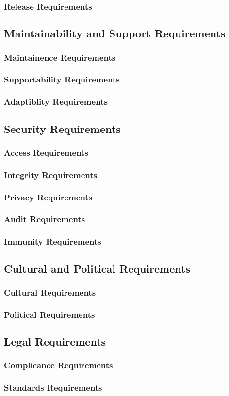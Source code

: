 \documentclass{article}
\begin{document}
\subsubsection{Release Requirements}

\subsection{Maintainability and Support Requirements}
\subsubsection{Maintainence Requirements}
\subsubsection{Supportability Requirements}
\subsubsection{Adaptiblity Requirements}

\subsection{Security Requirements}
\subsubsection{Access Requirements}
\subsubsection{Integrity Requirements}
\subsubsection{Privacy Requirements}
\subsubsection{Audit Requirements}
\subsubsection{Immunity Requirements}

\subsection{Cultural and Political Requirements}
\subsubsection{Cultural Requirements}
\subsubsection{Political Requirements}

\subsection{Legal Requirements}
\subsubsection{Complicance Requirements}
\subsubsection{Standards Requirements}
\end{document}
